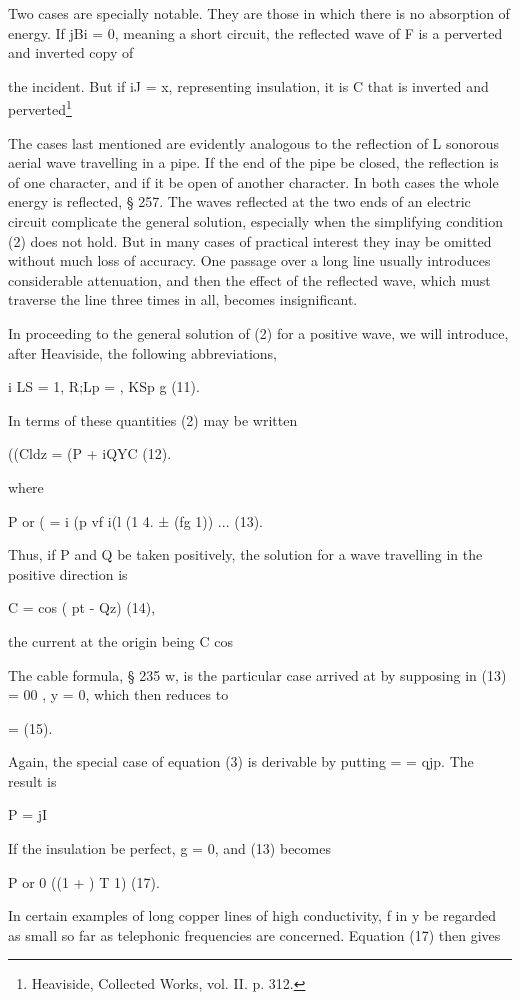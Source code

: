 Two cases are specially notable. They are those in which
there is no absorption of energy. If jBi = 0, meaning a short
circuit, the reflected wave of F is a perverted and inverted copy of

the incident. But if iJ = x, representing insulation, it is C that
is inverted and perverted\footnote{Heaviside, Collected Works, vol. II. p. 312.}

The cases last mentioned are evidently analogous to the reflection of L
sonorous aerial wave travelling in a pipe. If the end of
the pipe be closed, the reflection is of one character, and if it be
open of another character. In both cases the whole energy is
reflected, § 257.
The waves reflected at the two ends of an electric
circuit complicate the general solution, especially when the simplifying
condition (2) does not hold. But in many cases of practical interest they inay
be omitted without much loss of
accuracy. One passage over a long line usually introduces considerable
attenuation, and then the effect of the reflected wave,
which must traverse the line three times in all, becomes insignificant.

In proceeding to the general solution of (2) for a positive
wave, we will introduce, after Heaviside, the following abbreviations,

i LS = 1, R;Lp = , KSp g (11).

In terms of these quantities (2) may be written

((Cldz = (P + iQYC (12).

where

P or ( = i (p vf i(l (1 4. ± (fg  1)) ... (13).

Thus, if P and Q be taken positively, the solution for a wave
travelling in the positive direction is

C = cos ( pt - Qz) (14),

the current at the origin being C cos

The cable formula, § 235 w, is the particular case arrived at by
supposing in (13) = 00 , y = 0, which then reduces to

= (15).

Again, the special case of equation (3) is derivable by putting
 =  = qjp. The result is

P = jI%

If the insulation be perfect, g = 0, and (13) becomes

P or 0 ((1 + ) T 1) (17).

In certain examples of long copper lines of high conductivity,
f in y be regarded as small so far as telephonic frequencies are
concerned. Equation (17) then gives

